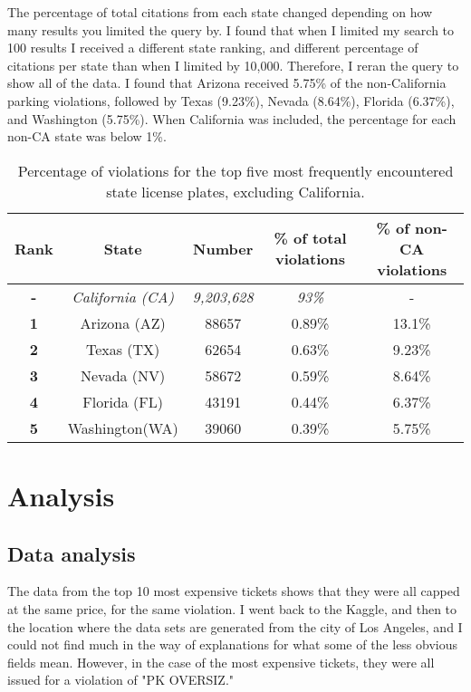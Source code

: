 \documentclass[]{article}
\begin{document}
	  The percentage of total citations from each state changed depending on how many results you limited the query by.  I found that when I limited my search to 100 results I received a different state ranking, and different percentage of citations per state than when I limited by 10,000.  Therefore, I reran the query to show all of the data.  I found that Arizona received 5.75\% of the non-California parking violations, followed by Texas (9.23\%), Nevada (8.64\%), Florida (6.37\%), and Washington (5.75\%).  When California was included, the percentage for each non-CA state was below 1\%.
	  
\begin{table}[!ht]
	\centering
	\begin{tabular}{| c | c  c  c c| }
		\hline
		\textbf{Rank} &\textbf{State} & \textbf{Number} & \textbf{\% of total violations} & \textbf{\% of non-CA violations}\\
		\hline
		\textbf{-}& \textit{California (CA)}& \textit{9,203,628} & \textit{93\%} & -\\
		\textbf{1}&Arizona (AZ) & 88657 & 0.89\% & 13.1\%\\
		\textbf{2}& Texas (TX)& 62654 & 0.63\% & 9.23\%\\
		\textbf{3}&Nevada (NV) & 58672 & 0.59\% & 8.64\%\\
		\textbf{4}&Florida (FL) & 43191 & 0.44\% & 6.37\%\\
		\textbf{5}&Washington(WA) & 39060 & 0.39\% & 5.75\%\\
		\hline
	\end{tabular}
	\caption{Percentage of violations for the top five most frequently encountered state license plates, excluding California.}
\end{table}

\section{Analysis}
\subsection{Data analysis}
The data from the top 10 most expensive tickets shows that they were all capped at the same price, for the same violation.  I went back to the Kaggle, and then to the location where the data sets are generated from the city of Los Angeles, and I could not find much in the way of explanations for what some of the less obvious fields mean.  However, in the case of the most expensive tickets, they were all issued for a violation of "PK OVERSIZ."
\end{document}
